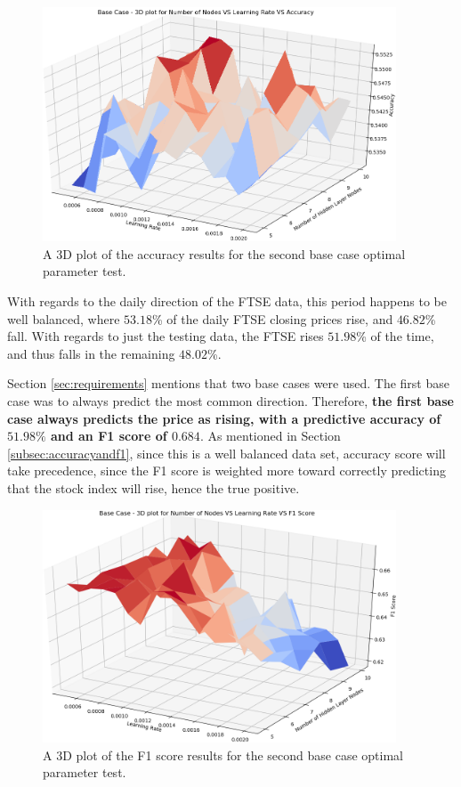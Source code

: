 \documentclass{UoYCSproject}
\begin{document}
\begin{figure}[h]
\includegraphics[width=10.5cm]{base_accuracy.png}
\centering
\caption{A 3D plot of the accuracy results for the second base case optimal parameter test.} 
\label{fig:base_plot_accuracy}
\end{figure}

With regards to the daily direction of the FTSE data, this period happens to be well balanced, where $53.18$\% of the daily FTSE closing prices rise, and $46.82$\% fall. With regards to just the testing data, the FTSE rises $51.98$\% of the time, and thus falls in the remaining $48.02$\%.

Section \ref{sec:requirements} mentions that two base cases were used. The first base case was to always predict the most common direction. Therefore, \textbf{the first base case always predicts the price as rising, with a predictive accuracy of $\boldsymbol{51.98\%}$ and an F1 score of $\boldsymbol{0.684}$}. As mentioned in Section \ref{subsec:accuracyandf1}, since this is a well balanced data set, accuracy score will take precedence, since the F1 score is weighted more toward correctly predicting that the stock index will rise, hence the true positive.

\begin{figure}[h]
\includegraphics[width=10.5cm]{base_f1.png}
\centering
\caption{A 3D plot of the F1 score results for the second base case optimal parameter test.} 
\label{fig:base_plot_f1}
\end{figure}
\end{document}
